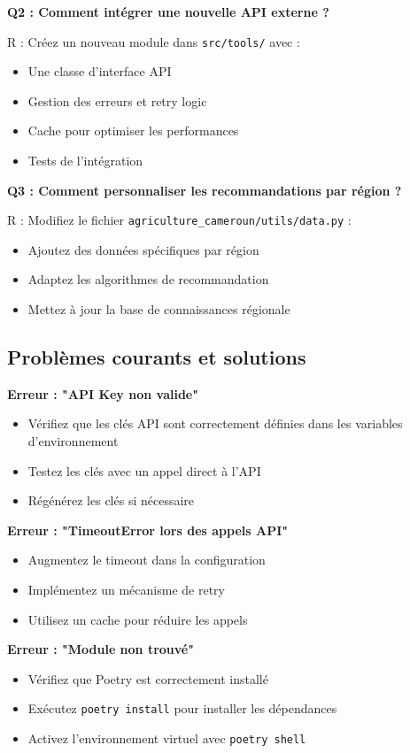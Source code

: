 \textbf{Q2 : Comment intégrer une nouvelle API externe ?}

R : Créez un nouveau module dans \texttt{src/tools/} avec :
\begin{itemize}
    \item Une classe d'interface API
    \item Gestion des erreurs et retry logic
    \item Cache pour optimiser les performances
    \item Tests de l'intégration
\end{itemize}

\textbf{Q3 : Comment personnaliser les recommandations par région ?}

R : Modifiez le fichier \texttt{agriculture\_cameroun/utils/data.py} :
\begin{itemize}
    \item Ajoutez des données spécifiques par région
    \item Adaptez les algorithmes de recommandation
    \item Mettez à jour la base de connaissances régionale
\end{itemize}

\subsection{Problèmes courants et solutions}

\textbf{Erreur : "API Key non valide"}
\begin{itemize}
    \item Vérifiez que les clés API sont correctement définies dans les variables d'environnement
    \item Testez les clés avec un appel direct à l'API
    \item Régénérez les clés si nécessaire
\end{itemize}

\textbf{Erreur : "TimeoutError lors des appels API"}
\begin{itemize}
    \item Augmentez le timeout dans la configuration
    \item Implémentez un mécanisme de retry
    \item Utilisez un cache pour réduire les appels
\end{itemize}


\textbf{Erreur : "Module non trouvé"}
\begin{itemize}
    \item Vérifiez que Poetry est correctement installé
    \item Exécutez \texttt{poetry install} pour installer les dépendances
    \item Activez l'environnement virtuel avec \texttt{poetry shell}
\end{itemize}

